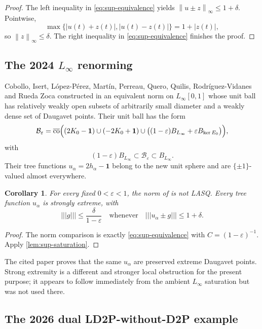 \documentclass[11pt]{article}
\newtheorem{corollary}[theorem]{Corollary}
\newcommand{\eps}{\varepsilon}
\newcommand{\clco}{\overline{\operatorname{co}}}
\newcommand{\norm}[1]{\left\lVert #1\right\rVert}
\newcommand{\abs}[1]{\left\lvert #1\right\rvert}
\newcommand{\newnorm}[1]{\left\lvert\!\left\lvert\!\left\lvert #1\right\rvert\!\right\rvert\!\right\rvert}
\begin{document}
\begin{proof}
The left inequality in \eqref{eq:sup-equivalence} yields $\norm{u\pm z}_\infty\le1+\delta$.  Pointwise,
\[
 \max\{\abs{u(t)+z(t)},\abs{u(t)-z(t)}\}=1+\abs{z(t)},
\]
so $\norm{z}_\infty\le\delta$.  The right inequality in \eqref{eq:sup-equivalence} finishes the proof.
\end{proof}

\subsection[The 2024 L-infinity renorming]{The 2024 $L_\infty$ renorming}

Cobollo, Isert, L\'opez-P\'erez, Mart\'in, Perreau, Quero, Quilis, Rodr\'iguez-Vidanes and Rueda Zoca constructed in \cite{CobolloEtAl2024} an equivalent norm on $L_\infty[0,1]$ whose unit ball has relatively weakly open subsets of arbitrarily small diameter and a weakly dense set of Daugavet points.  Their unit ball has the form
\[
 \mathcal B_\eps=\clco\Bigl(
 (2K_0-\mathbf1)\cup(-2K_0+\mathbf1)
 \cup\bigl((1-\eps)B_{L_\infty}+\eps B_{\ker E_0}\bigr)
 \Bigr),
\]
with
\[
 (1-\eps)B_{L_\infty}\subset\mathcal B_\eps\subset B_{L_\infty}.
\]
Their tree functions $u_\alpha=2h_\alpha-\mathbf1$ belong to the new unit sphere and are $\{\pm1\}$-valued almost everywhere.

\begin{corollary}
\label{cor:cobollo-not-lasq}
For every fixed $0<\eps<1$, the norm of \cite[Theorem~1.3]{CobolloEtAl2024} is not LASQ.  Every tree function $u_\alpha$ is strongly extreme, with
\[
 \newnorm{g}\le\frac{\delta}{1-\eps}
 \quad\text{whenever}\quad
 \newnorm{u_\alpha\pm g}\le1+\delta.
\]
\end{corollary}

\begin{proof}
The norm comparison is exactly \eqref{eq:sup-equivalence} with $C=(1-\eps)^{-1}$.  Apply \cref{lem:sup-saturation}.
\end{proof}

The cited paper proves that the same $u_\alpha$ are preserved extreme Daugavet points.  Strong extremity is a different and stronger local obstruction for the present purpose; it appears to follow immediately from the ambient $L_\infty$ saturation but was not used there.

\subsection{The 2026 dual LD2P-without-D2P example}
\end{document}
